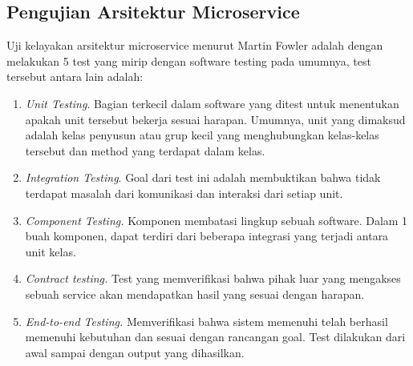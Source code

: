 \subsection{Pengujian Arsitektur Microservice}
Uji kelayakan arsitektur microservice menurut Martin Fowler adalah dengan melakukan 5 test yang mirip dengan software testing pada umumnya, test tersebut antara lain adalah:
\begin{enumerate}[leftmargin=*]
	\item \textit{Unit Testing}. Bagian terkecil dalam software yang ditest untuk menentukan apakah unit tersebut bekerja sesuai harapan. Umumnya, unit yang dimaksud adalah kelas penyusun atau grup kecil yang menghubungkan kelas-kelas tersebut dan method yang terdapat dalam kelas.
	\item \textit{Integration Testing}. Goal dari test ini adalah membuktikan bahwa tidak terdapat masalah dari komunikasi dan interaksi dari setiap unit.
	\item \textit{Component Testing.} Komponen membatasi lingkup sebuah software. Dalam 1 buah komponen, dapat terdiri dari beberapa integrasi yang terjadi antara unit kelas.
	\item \textit{Contract testing.} Test yang memverifikasi bahwa pihak luar yang mengakses sebuah service akan mendapatkan hasil yang sesuai dengan harapan.
	\item \textit{End-to-end Testing.} Memverifikasi bahwa sistem memenuhi telah berhasil memenuhi kebutuhan dan sesuai dengan rancangan goal. Test dilakukan dari awal sampai dengan output yang dihasilkan. 
\end{enumerate}
\begin{adjustbox}{width=1\textwidth}
	\centering
	\begin{minipage}{\linewidth}
	\end{minipage}
\end{adjustbox}\\

